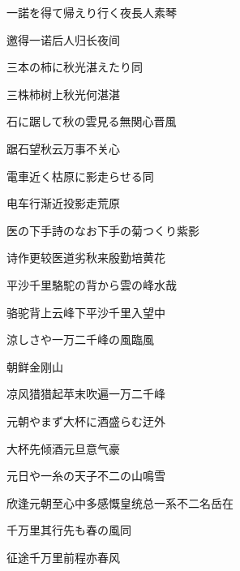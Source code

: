 \begin{haiku}
    {\FH 一諾を得て帰えり行く夜長人}\hfill{\FH 素琴}

    {\FK 邀得一诺后人归长夜间}
\end{haiku}

\begin{haiku}
    {\FH 三本の柿に秋光湛えたり}\hfill{\FH 同}

    {\FK 三株柿树上秋光何湛湛}
\end{haiku}

\begin{haiku}
    {\FH 石に踞して秋の雲見る無関心}\hfill{\FH 晋風}

    {\FK 踞石望秋云万事不关心}
\end{haiku}

\begin{haiku}
    {\FH 電車近く枯原に影走らせる}\hfill{\FH 同}

    {\FK 电车行渐近投影走荒原}
\end{haiku}

\begin{haiku}
    {\FH 医の下手詩のなお下手の菊つくり}\hfill{\FH 紫影}

    {\FK 诗作更较医道劣秋来殷勤培黄花}
\end{haiku}

\begin{haiku}
    {\FH 平沙千里駱駝の背から雲の峰}\hfill{\FH 水哉}

    {\FK 骆驼背上云峰下平沙千里入望中}
\end{haiku}

\begin{haiku}
    {\FH 涼しさや一万二千峰の風}\hfill{\FH 臨風}

    {\FK 朝鲜金刚山}

    {\FK 凉风猎猎起苹末吹遍一万二千峰}
\end{haiku}

\begin{haiku}
    {\FH 元朝やまず大杯に酒盛らむ}\hfill{\FH 迂外}

    {\FK 大杯先倾酒元旦意气豪}
\end{haiku}

\begin{haiku}
    {\FH 元日や一糸の天子不二の山}\hfill{\FH 鳴雪}

    {\FK 欣逢元朝至心中多感慨皇统总一系不二名岳在}
\end{haiku}

\begin{haiku}
    {\FH 千万里其行先も春の風}\hfill{\FH 同}

    {\FK 征途千万里前程亦春风}
\end{haiku}

